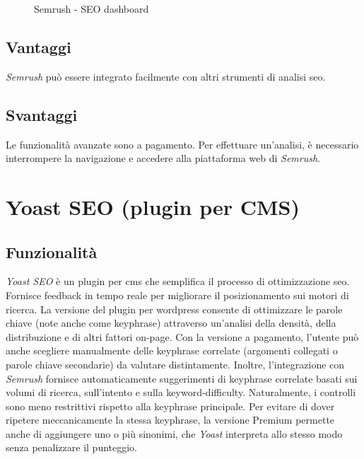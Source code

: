 \begin{figure}[H] 
    \centering 
    \caption{Semrush - SEO dashboard}
    \label{fig:semrush}
\end{figure}

\subsection{Vantaggi}
\par \textit{Semrush} può essere integrato facilmente con altri strumenti di analisi \gls{seo}.

\subsection{Svantaggi}
\par Le funzionalità avanzate sono a pagamento. Per effettuare un'analisi, è necessario interrompere la navigazione e accedere alla piattaforma web di \textit{Semrush}.

\section{Yoast SEO (plugin per CMS)}

\subsection{Funzionalità}
\par \textit{Yoast SEO} è un plugin per \gls{cms} che semplifica il processo di ottimizzazione \gls{seo}. Fornisce feedback in tempo reale per migliorare il posizionamento sui motori di ricerca. La versione del plugin per \gls{wordpress} consente di ottimizzare le parole chiave (note anche come keyphrase) attraverso un'analisi della densità, della distribuzione e di altri fattori \gls{on-page}. Con la versione a pagamento, l'utente può anche scegliere manualmente delle keyphrase correlate (argomenti collegati o parole chiave secondarie) da valutare distintamente. Inoltre, l'integrazione con \textit{Semrush} fornisce automaticamente suggerimenti di keyphrase correlate basati sui volumi di ricerca, sull'intento e sulla \gls{keyword-difficulty}. Naturalmente, i controlli sono meno restrittivi rispetto alla keyphrase principale. Per evitare di dover ripetere meccanicamente la stessa keyphrase, la versione Premium permette anche di aggiungere uno o più sinonimi, che \textit{Yoast} interpreta allo stesso modo senza penalizzare il punteggio.


